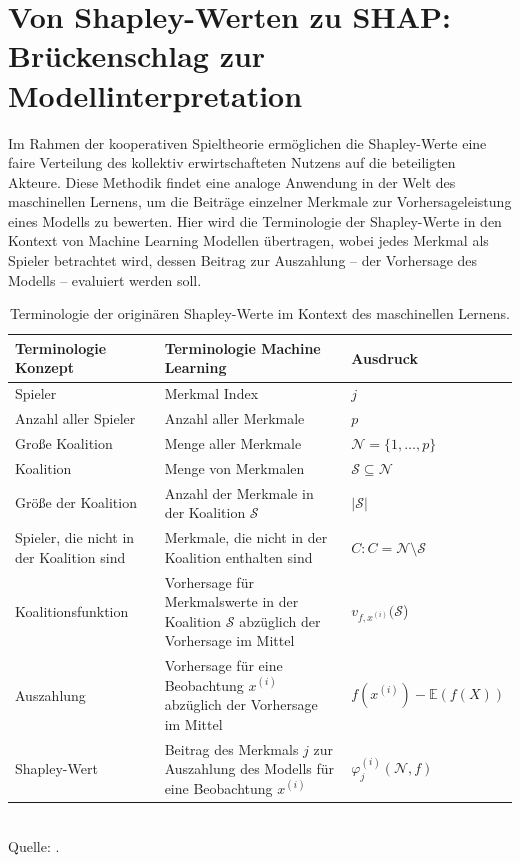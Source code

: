 \chapter{Von Shapley-Werten zu SHAP: Brückenschlag zur Modellinterpretation}

Im Rahmen der kooperativen Spieltheorie ermöglichen die Shapley-Werte eine faire Verteilung des kollektiv 
erwirtschafteten Nutzens auf die beteiligten Akteure. Diese Methodik findet eine analoge Anwendung 
in der Welt des maschinellen Lernens, um die Beiträge einzelner Merkmale zur Vorhersageleistung 
eines Modells zu bewerten. Hier wird die Terminologie der Shapley-Werte in den Kontext von Machine Learning 
Modellen übertragen, wobei jedes Merkmal als \glqq{}Spieler\grqq{} betrachtet wird, dessen Beitrag zur 
\glqq{}Auszahlung\grqq{} – der Vorhersage des Modells – evaluiert werden soll. 

\begin{table}[!h]
    \caption{Terminologie der originären Shapley-Werte im Kontext des maschinellen Lernens.}
    \footnotesize
    \begin{tabularx}{\textwidth}{XXX}
    \toprule
    Terminologie Konzept & Terminologie Machine Learning & Ausdruck \\
    \midrule
    Spieler & Merkmal Index & $j$ \\
    Anzahl aller Spieler & Anzahl aller Merkmale & $p$ \\
    Große Koalition & Menge aller Merkmale & $\mathcal{N} = \{1, \ldots, p\}$\\
    Koalition & Menge von Merkmalen & $\mathcal{S} \subseteq \mathcal{N}$ \\
    Größe der Koalition & Anzahl der Merkmale in der Koalition $\mathcal{S}$ & $|\mathcal{S}|$\\
    Spieler, die nicht in der Koalition sind & Merkmale, die nicht in der Koalition enthalten sind & $C: C = \mathcal{N} \setminus \mathcal{S}$ \\
    Koalitionsfunktion & Vorhersage für Merkmalswerte in der Koalition $\mathcal{S}$ abzüglich der Vorhersage im Mittel & $v_{f, x^{(i)}}(\mathcal{S}$)\\
    Auszahlung & Vorhersage für eine Beobachtung $x^{(i)}$ abzüglich der Vorhersage im Mittel & $f(x^{(i)}) -  \mathbb{E}(f(X))$\\
    Shapley-Wert & Beitrag des Merkmals $j$ zur Auszahlung des Modells für eine Beobachtung $x^{(i)}$& $\varphi_j^{(i)}(\mathcal{N}, f)$\\
    \bottomrule
    \end{tabularx}
    \label{tab:shapley_terms}
    \normalsize\\
    Quelle: \cite[S. 26]{Molnar_2023}.
\end{table}

